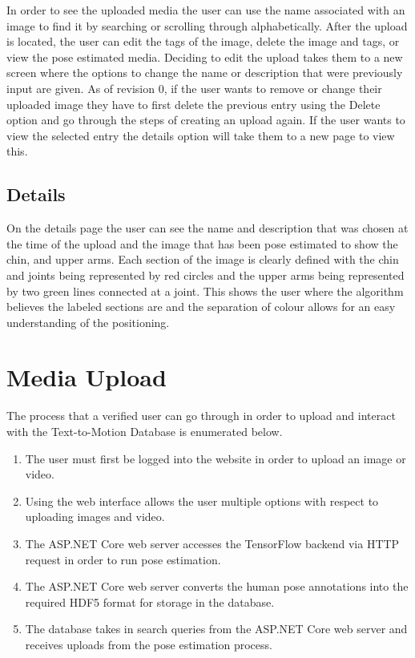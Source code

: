 \documentclass{scrreprt}
\begin{document}
In order to see the uploaded media the user can use the name associated with an
image to find it by searching or scrolling through alphabetically. After the
upload is located, the user can edit the tags of the image, delete the image
and tags, or view the pose estimated media. Deciding to edit the upload takes
them to a new screen where the options to change the name or description that
were previously input are given. As of revision 0, if the user wants to remove
or change their uploaded image they have to first delete the previous entry
using the Delete option and go through the steps of creating an upload again.
If the user wants to view the selected entry the details option will take them
to a new page to view this.

\subsection{Details}

On the details page the user can see the name and description that was chosen
at the time of the upload and the image that has been pose estimated to show
the chin, and upper arms. Each section of the image is clearly defined with the
chin and joints being represented by red circles and the upper arms being
represented by two green lines connected at a joint. This shows the user where
the algorithm believes the labeled sections are and the separation of colour
allows for an easy understanding of the positioning.

\section{Media Upload}

The process that a verified user can go through in order to upload and interact
with the Text-to-Motion Database is enumerated below.

\begin{enumerate}
        \item The user must first be logged into the website in order to upload an
                image or video.

        \item Using the web interface allows the user multiple options with
                respect to uploading images and video.

        \item The ASP.NET Core web server accesses the TensorFlow backend via
                HTTP request in order to run pose estimation.
                
        \item The ASP.NET Core web server converts the human pose annotations
                into the required HDF5 format for storage in the database.

        \item The database takes in search queries from the ASP.NET Core web
                server and receives uploads from the pose estimation process.
\end{enumerate}
\end{document}
